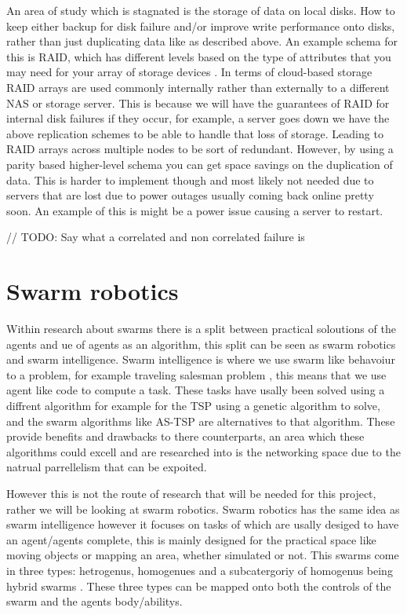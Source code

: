 \documentclass{UoYCSproject}
\begin{document}
An area of study which is stagnated is the storage of data on local disks. How to keep either backup for disk failure and/or improve write performance onto disks, rather than just duplicating data like as described above.
An example schema for this is RAID, which has different levels based on the type of attributes that you may need for your array of storage devices \cite{RAID Levels}.
In terms of cloud-based storage RAID arrays are used commonly internally rather than externally to a different NAS or storage server.
This is because we will have the guarantees of RAID for internal disk failures if they occur, for example, a server goes down we have the above replication schemes to be able to handle that loss of storage.
Leading to RAID arrays across multiple nodes to be sort of redundant.
However, by using a parity \cite{Raid parity} based higher-level schema you can get space savings on the duplication of data. This is harder to implement though and most likely not needed due to servers that are lost due to power outages usually coming back online pretty soon. An example of this is might be a power issue causing a server to restart.

// TODO: Say what a correlated and non correlated failure is

\section{Swarm robotics}
\label{sec:Robotics}

Within research about swarms there is a split between practical soloutions of the agents and ue of agents as an algorithm, this split can be seen as swarm robotics and swarm intelligence.
Swarm intelligence is where we use swarm like behavoiur to a problem, for example traveling salesman problem \cite{Swarm intellegiegence}, this means that we use agent like code to compute a task.
These tasks have usally been solved using a diffrent algorithm for example for the TSP using a genetic algorithm to solve, and the swarm algorithms like AS-TSP \cite{Swarm intellegiegence} are alternatives to that algorithm.
These provide benefits and drawbacks to there counterparts, an area which these algorithms could excell and are researched into is the networking space due to the natrual parrellelism that can be expoited.

However this is not the route of research that will be needed for this project, rather we will be looking at swarm robotics.
Swarm robotics has the same idea as swarm intelligence however it focuses on tasks of which are usally desiged to have an agent/agents complete, this is mainly designed for the practical space like moving objects or mapping an area, whether simulated or not.
This swarms come in three types: hetrogenus, homogenues and a subcatergoriy of homogenus being hybrid swarms \cite{Swarm robotics reviewed}.
These three types can be mapped onto both the controls of the swarm and the agents body/abilitys.
\end{document}
